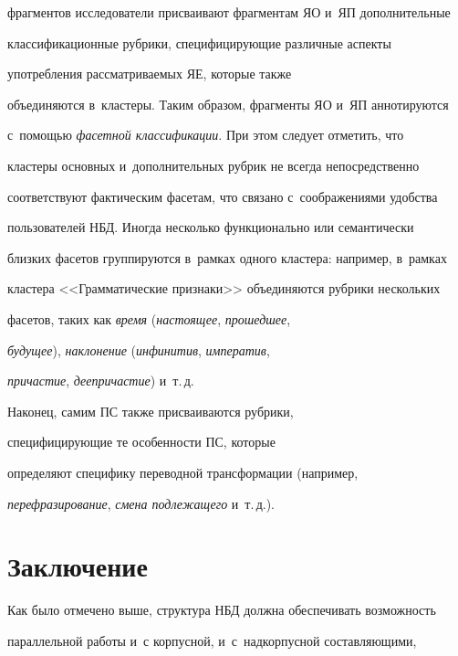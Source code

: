 фрагментов исследователи присваивают фрагментам ЯО и~ЯП дополнительные 


классификационные руб\-ри\-ки, спе\-ци\-фи\-ци\-ру\-ющие различные аспекты 


упо\-треб\-ле\-ния рас\-смат\-ри\-ва\-емых ЯЕ, которые так\-же 


объединяются в~кластеры. Таким образом, фраг\-мен\-ты ЯО и~ЯП аннотируются 


с~по\-мощью \textit{фасетной классификации}. При этом следует отметить, что 


клас\-те\-ры основных и~дополнительных руб\-рик не всегда непосредственно 


соответствуют фактическим фасетам, что связано с~соображениями удоб\-ст\-ва 


пользователей НБД. Иногда несколько функционально или семантически 


близ\-ких фасетов группируются в~рам\-ках одного клас\-те\-ра: например, в~рам\-ках 


клас\-те\-ра <<Грамматические признаки>> объединяются руб\-ри\-ки нескольких 


фасетов, таких как \textit{время} (\textit{на\-сто\-ящее}, \textit{прошедшее}, 


\textit{будущее}), \textit{наклонение} (\textit{инфинитив}, \textit{императив}, 


\textit{причастие}, \textit{деепричастие}) и~т.\,д.


   


   Наконец, самим ПС так\-же присваиваются руб\-ри\-ки, 


специфицирующие те особенности ПС, которые 


определяют специфику переводной транс\-фор\-ма\-ции (например, 


\textit{перефразирование}, \textit{смена подлежащего} и~т.\,д.).





\section{Заключение}





   Как было отмечено выше, структура НБД должна обеспечивать воз\-мож\-ность 


   параллельной работы и~с корпусной, и~с~надкорпусной со\-став\-ля\-ющи\-ми, 


